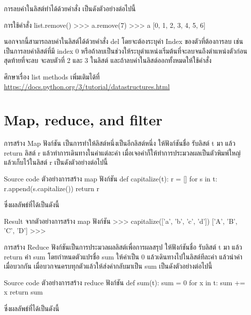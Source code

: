 การลบค่าในลิสต์ทำได้ด้วยคำสั่ง   เป็นดังตัวอย่างต่อไปนี้
\begin{codelist}{การใช้คำสั่ง list.remove()}{}
>>> a.remove(7)
>>> a
[0, 1, 2, 3, 4, 5, 6]
\end{codelist}


นอกจากนี้สามารถลบค่าในลิสต์ได้ด้วยคำสั่ง del โดยจะต้องระบุค่า Index ของตัวที่ต้องการลบ เช่น   เป็นการลบค่าลิสต์ที่มี index 0 หรือถ้าลบเป็นช่วงให้ระบุตำแหน่งเริ่มต้นที่จะลบจนถึงตำแหน่งตัวก่อนสุดท้ายที่จะลบ   จะลบตัวที่ 2 และ 3 ในลิสต์ และถ้าลบค่าในลิสต์ออกทั้งหมดให้ใช้คำสั่ง  

ศึกษาเรื่อง list methods เพิ่มเติมได้ที่ \url{https://docs.python.org/3/tutorial/datastructures.html}

\section{Map, reduce, and filter}

การสร้าง Map ฟังก์ชัน เป็นการทำให้ลิสต์หนึ่งเป็นอีกลิสต์หนึ่ง ให้ฟังก์ชันชื่อ   รับลิสต์ t มา แล้ว return ลิสต์ r แล้วทำการเดินทางในค่าแต่ละค่า เมื่อเจอค่าก็ให้ทำการประมวลผลเป็นตัวพิมพ์ใหญ่ แล้วเก็บไว้ในลิสต์ r เป็นดังตัวอย่างต่อไปนี้

\begin{codelist}{Source code ตัวอย่างการสร้าง map ฟังก์ชัน}{}
def capitalize(t):
    r = []
    for s in t:
        r.append(s.capitalize())
    return r
\end{codelist}

ซึ่งผลลัพธ์ที่ได้เป็นดังนี้

\begin{codelist}{Result จากตัวอย่างการสร้าง map ฟังก์ชัน}{}
>>> capitalize(['a', 'b', 'c', 'd'])
['A', 'B', 'C', 'D']
>>>
\end{codelist}


การสร้าง Reduce ฟังก์ชันเป็นการประมวลผลลิสต์เพื่อการผลสรุป ให้ฟังก์ชันชื่อ   รับลิสต์ t มา แล้ว return ค่า sum โดยกำหนดตัวแปรชื่อ sum ให้ค่าเป็น 0 แล้วเดินทางไปในลิสต์ทีละค่า แล้วนำค่าเมื่อบวกกัน เมื่อบวกจนครบทุกตัวแล้วให้ส่งค่ากลับมาเป็น sum เป็นดังตัวอย่างต่อไปนี้

\begin{codelist}{Source code ตัวอย่างการสร้าง reduce ฟังก์ชัน}{}
def sum(t):
    sum = 0
    for x in t: sum += x
    return sum
\end{codelist}

ซึ่งผลลัพธ์ที่ได้เป็นดังนี้

